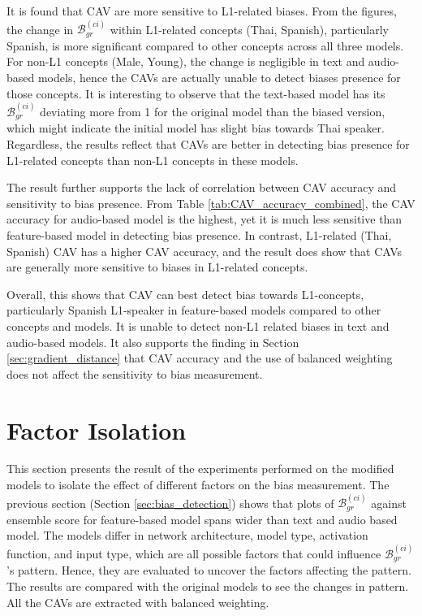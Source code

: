 It is found that CAV are more sensitive to L1-related biases. From the figures, the change in $\mathcal{B}^{(ci)}_{gr}$ within L1-related concepts (Thai, Spanish), particularly Spanish, is more significant compared to other concepts across all three models. For non-L1 concepts (Male, Young), the change is negligible in text and audio-based models, hence the CAVs are actually unable to detect biases presence for those concepts. It is interesting to observe that the text-based model has its $\mathcal{B}^{(ci)}_{gr}$ deviating more from 1 for the original model than the biased version, which might indicate the initial model has slight bias towards Thai speaker. Regardless, the results reflect that CAVs are better in detecting bias presence for L1-related concepts than non-L1 concepts in these models.

The result further supports the lack of correlation between CAV accuracy and sensitivity to bias presence. From Table \ref{tab:CAV_accuracy_combined}, the CAV accuracy for audio-based model is the highest, yet it is much less sensitive than feature-based model in detecting bias presence. In contrast, L1-related (Thai, Spanish) CAV has a higher CAV accuracy, and the result does show that CAVs are generally more sensitive to biases in L1-related concepts.

Overall, this shows that CAV can best detect bias towards L1-concepts, particularly Spanish L1-speaker in feature-based models compared to other concepts and models. It is unable to detect non-L1 related biases in text and audio-based models. It also supports the finding in Section \ref{sec:gradient_distance} that CAV accuracy and the use of balanced weighting does not affect the sensitivity to bias measurement.

\section{Factor Isolation} \label{sec:factor_isolation}
This section presents the result of the experiments performed on the modified models to isolate the effect of different factors on the bias measurement. The previous section (Section \ref{sec:bias_detection}) shows that plots of $\mathcal{B}^{(ci)}_{gr}$ against ensemble score for feature-based model spans wider than text and audio based model. The models differ in network architecture, model type, activation function, and input type, which are all possible factors that could influence $\mathcal{B}^{(ci)}_{gr}$'s pattern. Hence, they are evaluated to uncover the factors affecting the pattern. The results are compared with the original models to see the changes in pattern. All the CAVs are extracted with balanced weighting.

